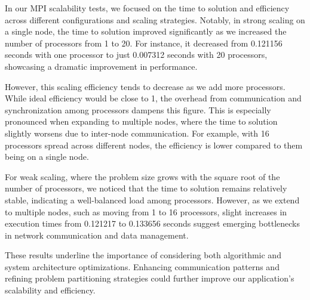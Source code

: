 \documentclass[unicode,11pt,a4paper,oneside,numbers=endperiod,openany]{scrartcl}
\begin{document}
In our MPI scalability tests, we focused on the time to solution and efficiency across different configurations and scaling strategies. Notably, in strong scaling on a single node, the time to solution improved significantly as we increased the number of processors from 1 to 20. For instance, it decreased from 0.121156 seconds with one processor to just 0.007312 seconds with 20 processors, showcasing a dramatic improvement in performance.

However, this scaling efficiency tends to decrease as we add more processors. While ideal efficiency would be close to 1, the overhead from communication and synchronization among processors dampens this figure. This is especially pronounced when expanding to multiple nodes, where the time to solution slightly worsens due to inter-node communication. For example, with 16 processors spread across different nodes, the efficiency is lower compared to them being on a single node.

For weak scaling, where the problem size grows with the square root of the number of processors, we noticed that the time to solution remains relatively stable, indicating a well-balanced load among processors. However, as we extend to multiple nodes, such as moving from 1 to 16 processors, slight increases in execution times from 0.121217 to 0.133656 seconds suggest emerging bottlenecks in network communication and data management.

These results underline the importance of considering both algorithmic and system architecture optimizations. Enhancing communication patterns and refining problem partitioning strategies could further improve our application's scalability and efficiency.
\end{document}
